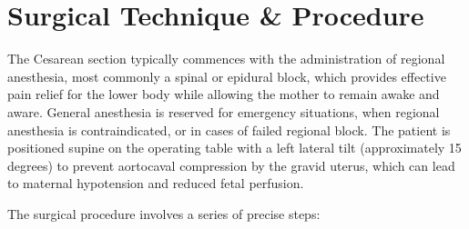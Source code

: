 \section*{Surgical Technique \& Procedure}
The Cesarean section typically commences with the administration of regional anesthesia, most commonly a spinal or epidural block, which provides effective pain relief for the lower body while allowing the mother to remain awake and aware. General anesthesia is reserved for emergency situations, when regional anesthesia is contraindicated, or in cases of failed regional block. The patient is positioned supine on the operating table with a left lateral tilt (approximately 15 degrees) to prevent aortocaval compression by the gravid uterus, which can lead to maternal hypotension and reduced fetal perfusion.

The surgical procedure involves a series of precise steps:

